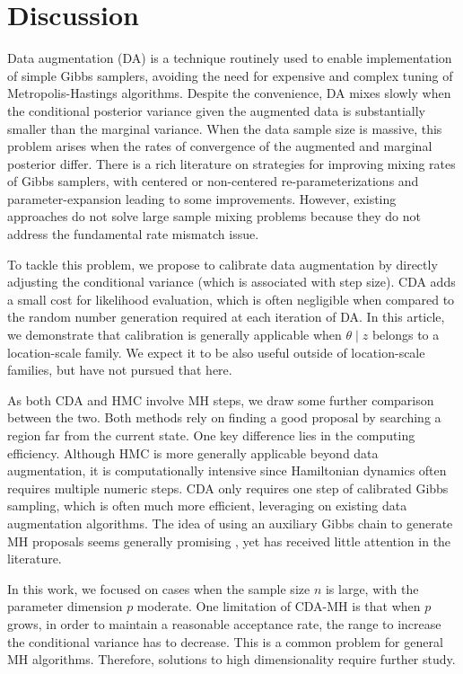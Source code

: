 \documentclass[twoside,11pt]{article}
\newcommand{\1}{\mathbf 1}
\begin{document}
{\section{Discussion}
Data augmentation (DA) is a technique routinely used to enable implementation of simple Gibbs samplers, avoiding the need for expensive and complex tuning of Metropolis-Hastings algorithms.
Despite the convenience, DA mixes slowly when the conditional posterior variance given the augmented data is substantially smaller than the marginal variance.  When the data sample size is massive, this problem arises when the rates of convergence of the augmented and marginal posterior differ. There is a rich literature on strategies for improving mixing rates of Gibbs samplers, with centered or non-centered re-parameterizations \citep{papaspiliopoulos2007general} and parameter-expansion \citep{liu1999parameter} leading to some improvements.  However, existing approaches {do not} solve large sample mixing problems because they do not address the fundamental rate mismatch issue.

To tackle this problem, we propose to calibrate data augmentation by directly adjusting the conditional variance (which is associated with step size).  CDA adds a small cost for likelihood evaluation, which is often negligible when compared to the random number generation required at each iteration of DA. In this article, we demonstrate that calibration is generally applicable when $\theta \mid z$ belongs to a location-scale family. We expect it to be also useful outside of location-scale families, but have not pursued that here.

As both CDA and HMC involve MH steps, we draw some further comparison between the two. Both methods rely on finding a good proposal by searching a region far from the current state. One key difference lies in the computing efficiency. Although HMC is more generally applicable beyond data augmentation, it is computationally intensive since Hamiltonian dynamics often requires multiple numeric steps. CDA only requires one step of calibrated Gibbs sampling, which is often much more efficient, leveraging on existing data augmentation algorithms. The idea of using an auxiliary Gibbs chain to generate MH proposals seems generally promising \citep{tran2016adaptive}, yet has received little attention in the literature.

{In this work, we focused on cases when the sample size  $n$ is large, with the parameter dimension $p$ moderate. One limitation of CDA-MH is that when $p$ grows, in order to maintain a reasonable acceptance rate, the range to increase the conditional variance has to decrease. This is a common problem for general MH algorithms. Therefore, solutions to high dimensionality require further study.}

}
\end{document}
